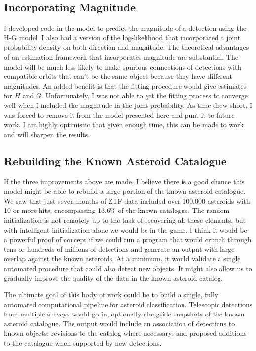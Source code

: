 \subsection{Incorporating Magnitude}
I developed code in the  model to predict the magnitude of a detection using the H-G model.
I also had a version of the log-likelihood that incorporated a joint probability density on both direction and magnitude.
The theoretical advantages of an estimation framework that incorporates magnitude are substantial.
The model will be much less likely to make spurious connections of detections with compatible orbits
that can't be the same object because they have different magnitudes.
An added benefit is that the fitting procedure would give estimates for $H$ and $G$.
Unfortunately, I was not able to get the fitting process to converge well when I included the magnitude in the joint probability.
As time drew short, I was forced to remove it from the model presented here and punt it to future work.
I am highly optimistic that given enough time, this can be made to work and will sharpen the results.

\subsection{Rebuilding the Known Asteroid Catalogue}
If the three improvements above are made, I believe there is a good chance this model might be able to rebuild a large portion of the known asteroid catalogue.
We saw that just seven months of ZTF data included over 100,000 asteroids with 10 or more hits, encompassing 13.6\% of the known catalogue.
The random initialization is not remotely up to the task of recovering all these elements, but with intelligent initialization alone we would be in the game.
I think it would be a powerful proof of concept if we could run a program that would crunch through tens or hundreds of millions of detections and
generate an output with large overlap against the known asteroids.
At a minimum, it would validate a single automated procedure that could also detect new objects.
It might also allow us to gradually improve the quality of the data in the known asteroid catalog.

The ultimate goal of this body of work could be to build a single, fully automated computational pipeline for asteroid classification.
Telescopic detections from multiple surveys would go in, optionally alongside snapshots of the known asteroid catalogue.
The output would include an association of detections to known objects; revisions to the catalog where necessary; 
and proposed additions to the catalogue when supported by new detections.